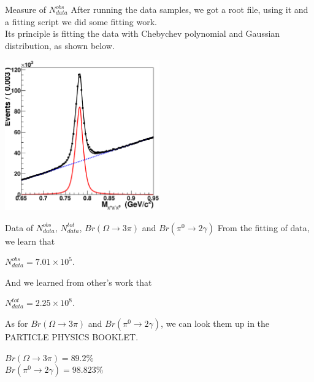\documentclass{beamer}
\begin{document}
\begin{frame}{Measure of $N^{obs}_{data}$}
After running the data samples, we got a root file, using it and a fitting script we did some fitting work.\\
		  Its principle is fitting the data with Chebychev polynomial and Gaussian distribution, as shown below.\\
		  \begin{center}
		  \includegraphics[width=0.5\textwidth]{graphics/data.eps}
		  \end{center}
\end{frame}
\begin{frame}{Data of $N^{obs}_{data}$, $N^{tot}_{data}$, $Br(\Omega\!\rightarrow\!3\pi)$ and $Br(\pi^0\!\rightarrow\!2\gamma)$}
From the fitting of data, we learn that\\
		 \begin{center}
		 $N^{obs}_{data}=7.01\times 10^5$.
			 \end{center}
		 And we learned from other's work that\\
		 \begin{center}
		 $N^{tot}_{data}=2.25 \times 10^8$.
			 \end{center}
		 \bigskip
As for $Br(\Omega\!\rightarrow\!3\pi)$ and $Br(\pi^0\!\rightarrow\!2\gamma)$, we can look them up in the PARTICLE PHYSICS BOOKLET.
\begin{center}
		 $Br(\Omega\!\rightarrow\!3\pi)=89.2\%$\\
		$Br(\pi^0\!\rightarrow\!2\gamma)=98.823\%$\\
		\end{center}
\end{frame}
\end{document}
